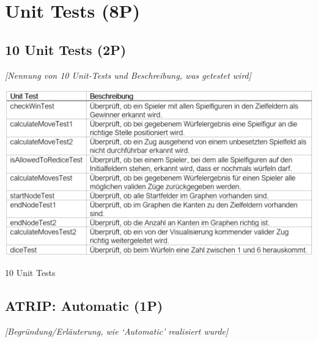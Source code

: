 
\titlespacing*{\chapter}{0pt}{-30mm}{10pt}
  
\chapter{Unit Tests (8P)}
\pagestyle{scrheadings}
\clearscrheadfoot
{}
\setcounter{page}{20}
\ofoot[\pagemark]{\pagemark}
\onehalfspacing

\section{10 Unit Tests (2P)}
\emph{[Nennung von 10 Unit-Tests und Beschreibung, was getestet wird]}

\begin{table}[htbp]
\centering
\centerline{\includegraphics[scale=.55]{unitteststable}}
\caption{10 Unit Tests}
\label{tab:unitteststable}
\end{table}

\section{ATRIP: Automatic (1P)}
\emph{[Begründung/Erläuterung, wie ‘Automatic’ realisiert wurde]}
\vspace{.4cm}

